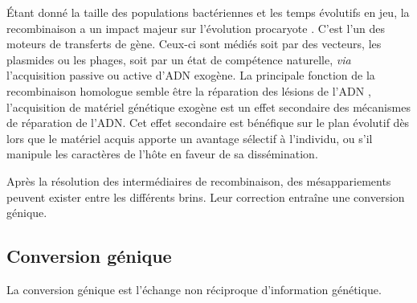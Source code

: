 \documentclass[11pt, oneside]{scrartcl}
\begin{document}
Étant donné la taille des populations bactériennes et les temps évolutifs en
jeu, la recombinaison a un impact majeur sur l'évolution procaryote
\cite{didelot_impact_2010}. C'est l'un des moteurs de transferts de gène.
Ceux-ci sont médiés soit par des vecteurs, les plasmides ou les phages, soit par
un état de compétence naturelle, \emph{via} l'acquisition passive ou active d'ADN
exogène. La principale fonction de la recombinaison homologue semble être la
réparation des lésions de l'ADN \cite{fall_horizontal_2007}, l'acquisition de
matériel génétique exogène est un effet secondaire des mécanismes de réparation
de l'ADN. Cet effet secondaire est bénéfique sur le plan évolutif dès lors que
le matériel acquis apporte un avantage sélectif à l'individu, ou s'il manipule
les caractères de l'hôte en faveur de sa
dissémination\cite{gogarten_horizontal_2005}.

\begin{transition}
Après la résolution des intermédiaires de recombinaison, des mésappariements
peuvent exister entre les différents brins. Leur correction entraîne une
conversion génique.
\end{transition}


\subsection{Conversion génique}
\label{sec:orgheadline6}

La conversion génique est l'échange non réciproque d'information
génétique\cite{chen_gene_2007}.
\end{document}

